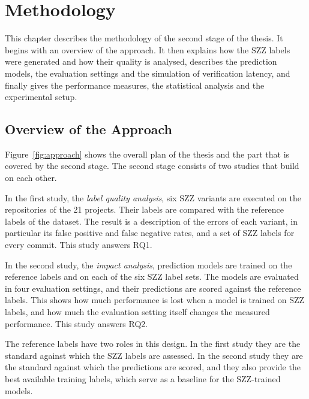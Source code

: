 \documentclass[12pt,a4paper,oneside]{report}
\begin{document}
\chapter{Methodology}\label{ch:method}

This chapter describes the methodology of the second stage of the thesis. It
begins with an overview of the approach. It then explains how the SZZ labels
were generated and how their quality is analysed, describes the prediction
models, the evaluation settings and the simulation of verification latency,
and finally gives the performance measures, the statistical analysis and the
experimental setup.

\section{Overview of the Approach}

Figure~\ref{fig:approach} shows the overall plan of the thesis and the part
that is covered by the second stage. The second stage consists of two studies
that build on each other.

In the first study, the \emph{label quality analysis}, six SZZ variants are
executed on the repositories of the 21 projects. Their labels are compared
with the reference labels of the dataset. The result is a description of the
errors of each variant, in particular its false positive and false negative
rates, and a set of SZZ labels for every commit. This study answers RQ1.

In the second study, the \emph{impact analysis}, prediction models are
trained on the reference labels and on each of the six SZZ label sets. The
models are evaluated in four evaluation settings, and their predictions are
scored against the reference labels. This shows how much performance is lost
when a model is trained on SZZ labels, and how much the evaluation setting
itself changes the measured performance. This study answers RQ2.

The reference labels have two roles in this design. In the first study they
are the standard against which the SZZ labels are assessed. In the second
study they are the standard against which the predictions are scored, and
they also provide the best available training labels, which serve as a
baseline for the SZZ-trained models.
\end{document}
